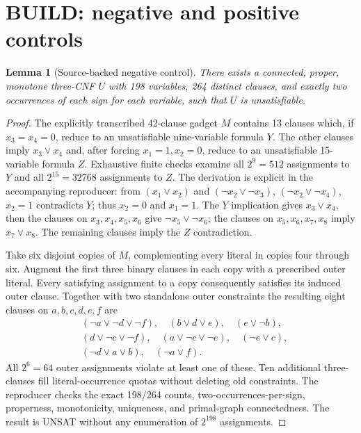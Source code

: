 \documentclass[11pt]{article}
\newtheorem{lemma}{Lemma}
\begin{document}
\section{BUILD: negative and positive controls}
\begin{lemma}[Source-backed negative control]
There exists a connected, proper, monotone three-CNF $U$ with
198 variables, 264 distinct clauses, and exactly two occurrences
of each sign for each variable, such that $U$ is unsatisfiable.
\end{lemma}
\begin{proof}
The explicitly transcribed 42-clause gadget $M$ contains 13 clauses
which, if $x_3=x_4=0$, reduce to an unsatisfiable nine-variable
formula $Y$. The other clauses imply $x_3\vee x_4$ and, after
forcing $x_1=1,x_2=0$, reduce to an unsatisfiable 15-variable
formula $Z$. Exhaustive finite checks examine all $2^9=512$
assignments to $Y$ and all $2^{15}=32768$ assignments to $Z$.
The derivation is explicit in the accompanying reproducer:
from $(x_1\vee x_2)$ and $(\neg x_2\vee\neg x_3)$,
$(\neg x_2\vee\neg x_4)$, $x_2=1$ contradicts $Y$;
thus $x_2=0$ and $x_1=1$. The $Y$ implication gives
$x_3\vee x_4$, then the clauses on $x_3,x_4,x_5,x_6$
give $\neg x_5\vee\neg x_6$; the clauses on
$x_5,x_6,x_7,x_8$ imply $x_7\vee x_8$.
The remaining clauses imply the $Z$ contradiction.

Take six disjoint copies of $M$, complementing every literal in
copies four through six. Augment the first three binary clauses in
each copy with a prescribed outer literal. Every satisfying assignment
to a copy consequently satisfies its induced outer clause.
Together with two standalone outer constraints the resulting
eight clauses on $a,b,c,d,e,f$ are
\begin{align*}
&(\neg a\vee\neg d\vee\neg f),\quad(b\vee d\vee e),\quad(e\vee\neg b),\\
&(d\vee\neg c\vee\neg f),\quad(a\vee\neg c\vee\neg e),\quad(\neg e\vee c),\\
&(\neg d\vee a\vee b),\quad(\neg a\vee f).
\end{align*}
All $2^6=64$ outer assignments violate at least one of these.
Ten additional three-clauses fill literal-occurrence quotas without
deleting old constraints. The reproducer checks the exact 198/264
counts, two-occurrences-per-sign, properness, monotonicity, uniqueness,
and primal-graph connectedness. The result is UNSAT without any
enumeration of $2^{198}$ assignments.
\end{proof}
\end{document}
